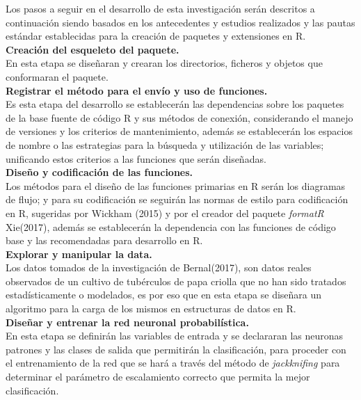 Los pasos a seguir en el desarrollo de esta investigación serán descritos a continuación siendo basados en los antecedentes y estudios realizados y las pautas estándar establecidas para la creación de paquetes y extensiones en R.\\

\noindent
\textbf{Creación del esqueleto del paquete.}\\
En esta etapa se diseñaran y crearan los directorios, ficheros y objetos que conformaran el paquete.\\

\noindent
\textbf{Registrar el método para el envío y uso de funciones.}\\

Es esta etapa del desarrollo se establecerán las dependencias sobre los paquetes de la base fuente de código R y sus métodos de conexión, considerando el manejo de versiones y los criterios de mantenimiento, además  se establecerán  los espacios de nombre o las estrategias para la búsqueda y utilización de las variables; unificando estos criterios a las funciones que serán diseñadas.\\

\noindent
\textbf{Diseño y codificación de las funciones.}\\

Los m\'etodos para el dise\~no de las funciones primarias en R ser\'an los diagramas de flujo; y para su codificaci\'on se seguir\'an las normas de estilo para codificaci\'on en R, sugeridas por Wickham (2015) y por el creador del paquete \emph{formatR} Xie(2017), adem\'as se establecer\'an la dependencia con las funciones de c\'odigo base y las recomendadas para desarrollo en R.\\

\noindent
\textbf{Explorar y manipular la data.}\\

Los datos tomados de la investigación de Bernal(2017), son datos reales observados de un cultivo de tubérculos de papa criolla que no han sido tratados estadísticamente o modelados, es por eso que en esta etapa se diseñara un algoritmo para la carga de los mismos en estructuras de datos en R.\\

\noindent
\textbf{Diseñar y entrenar la red neuronal probabilística.}\\

En esta etapa se definirán las variables de entrada y se declararan las neuronas patrones y las clases de salida que permitirán la clasificación, para proceder con el entrenamiento de la red que se hará a través del método de \textit{jackknifing} para determinar el parámetro de escalamiento correcto que permita la mejor clasificación.\\

